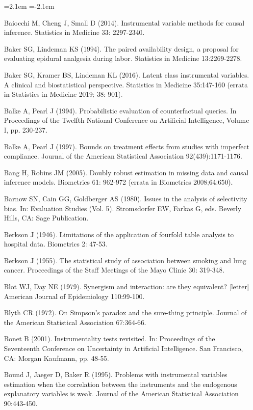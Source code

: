\begin{list}{}{\leftmargin=2.1em   \itemindent=-2.1em \parsep=0pt \itemsep=1.6pt \topsep=4pt \rightmargin=0pt}
\item Baiocchi M, Cheng J, Small D (2014). Instrumental variable methods for causal inference. Statistics in Medicine 33: 2297-2340.
\item Baker SG, Lindeman KS (1994). The paired availability design, a proposal for evaluating epidural analgesia during labor. Statistics in Medicine 13:2269-2278.
\item Baker SG, Kramer BS, Lindeman KL (2016). Latent class instrumental variables. A clinical and biostatistical perspective. Statistics in Medicine 35:147-160 (errata in Statistics in Medicine 2019; 38: 901).
\item Balke A, Pearl J (1994). Probabilistic evaluation of counterfactual queries. In Proceedings of the Twelfth National Conference on Artificial Intelligence, Volume I, pp. 230-237.
\item Balke A, Pearl J (1997). Bounds on treatment effects from studies with imperfect compliance. Journal of the American Statistical Association 92(439):1171-1176.
\item Bang H, Robins JM (2005). Doubly robust estimation in missing data and causal inference models. Biometrics 61: 962-972 (errata in Biometrics 2008;64:650).
\item Barnow SN, Cain GG, Goldberger AS (1980). Issues in the analysis of selectivity bias. In: Evaluation Studies (Vol. 5). Stromsdorfer EW, Farkas G, eds. Beverly Hills, CA: Sage Publication.
\item Berkson J (1946). Limitations of the application of fourfold table analysis to hospital data. Biometrics 2: 47-53.
\item Berkson J (1955). The statistical study of association between smoking and lung cancer. Proceedings of the Staff Meetings of the Mayo Clinic 30: 319-348.
\item Blot WJ, Day NE (1979). Synergism and interaction: are they equivalent? [letter] American Journal of Epidemiology 110:99-100.
\item Blyth CR (1972). On Simpson's paradox and the sure-thing principle. Journal of the American Statistical Association 67:364-66.
\item Bonet B (2001). Instrumentality tests revisited. In: Proceedings of the Seventeenth Conference on Uncertainty in Artificial Intelligence. San Francisco, CA: Morgan Kaufmann, pp. 48-55.
\item Bound J, Jaeger D, Baker R (1995). Problems with instrumental variables estimation when the correlation between the instruments and the endogenous explanatory variables is weak. Journal of the American Statistical Association 90:443-450.

\end{list}
